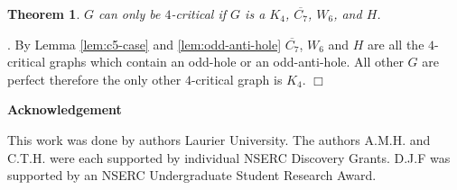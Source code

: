 \documentclass[12pt]{article}
\newtheorem{Theorem}{Theorem}[section]
\begin{document}
\begin{Theorem}\label{thm:finite-4-critical}
$G$ can only be $4$-critical if $G$ is a $K_4$, $\overline{C_7}$, $W_6$, and $H$.
\end{Theorem}
.
By Lemma \ref{lem:c5-case} and \ref{lem:odd-anti-hole} $\overline{C_7}$, $W_6$ and $H$ are all the $4$-critical graphs which contain an odd-hole or an odd-anti-hole. All other $G$ are perfect therefore the only other $4$-critical graph is $K_4$. $\Box$



\begin{center}
{\bf Acknowledgement}
\end{center}
This work was done by authors  Laurier University. The authors A.M.H. and C.T.H. were each supported by individual NSERC Discovery Grants. D.J.F was supported by an NSERC Undergraduate Student Research Award.


\clearpage
\begin{thebibliography}{99}

\end{thebibliography}
\end{document}

